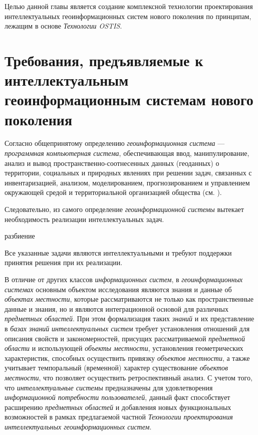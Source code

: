 Целью данной главы является создание комплексной технологии проектирования интеллектуальных геоинформационных систем нового поколения по принципам, лежащим в основе \textit{Технологии OSTIS}.

\section{Требования, предъявляемые к интеллектуальным геоинформационным системам нового поколения}
\label{chapter_gis_sec_requirements}

Согласно общепринятому определению \textit{геоинформационная система} --- \textit{программная компьютерная система}, обеспечивающая ввод, манипулирование, анализ и вывод пространственно-соотнесенных данных (геоданных) о территории, социальных и природных явлениях при решении задач, связанных с инвентаризацией, анализом, моделированием, прогнозированием и управлением окружающей средой и территориальной организацией общества (см. ).

Следовательно, из самого определение \textit{геоинформационной системы} вытекает необходимость реализации интеллектуальных задач.

\begin{SCn}
\begin{scnrelfromset}{разбиение}
\end{scnrelfromset}
\end{SCn}

Все указанные задачи являются интеллектуальными и требуют поддержки принятия решения при их реализации.

В отличие от других классов \textit{информационных систем}, в \textit{геоинформационных системах} основным объектом исследования являются знания и данные об \textit{объектах местности}, которые рассматриваются не только как пространственные данные и знания, но и являются интеграционной основой для различных \textit{предметных областей}. При этом формализация таких \textit{знаний} и их представление в \textit{базах знаний} \textit{интеллектуальных систем} требует установления отношений для описания свойств и закономерностей, присущих рассматриваемой \textit{предметной области} и использующей \textit{объекты местности}, установления геометрических характеристик, способных осуществить привязку \textit{объектов местности}, а также учитывает темпоральный (временной) характер существование \textit{объектов местности}, что позволяет осуществить ретроспективный анализ. С учетом того, что \textit{интеллектуальные системы} предназначены для удовлетворения \textit{информационной потребности пользователей}, данный факт способствует расширению \textit{предметных областей} и добавления новых функциональных возможностей в рамках предлагаемой частной \textit{Технологии проектирования интеллектуальных геоинформационных систем}.

